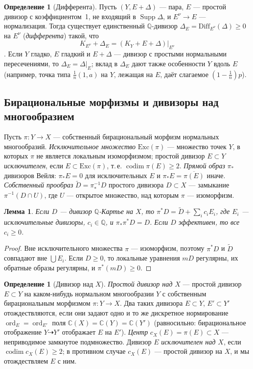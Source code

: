 \documentclass[11pt,a4paper]{article}
\theoremstyle{plain}
\newtheorem{lemma}[theorem]{Лемма}
\theoremstyle{definition}
\newtheorem{definition}[theorem]{Определение}
\theoremstyle{remark}
\renewcommand{\C}{\mathbb{C}}
\newcommand{\Q}{\mathbb{Q}}
\DeclareMathOperator{\ord}{ord}
\DeclareMathOperator{\codim}{codim}
\DeclareMathOperator{\Supp}{Supp}
\begin{document}
\begin{definition}[Дифферента]\label{def:different}
Пусть $(Y,E+\Delta)$ --- пара, $E$ --- простой дивизор с коэффициентом~1, не входящий в
$\Supp\Delta$, и $E^\nu\to E$ --- нормализация. Тогда существует единственный $\Q$-дивизор
$\Delta_E=\mathrm{Diff}_{E^\nu}(\Delta)\ge0$ на $E^\nu$ (\emph{дифферента}) такой, что
\[
K_{E^\nu}+\Delta_E=(K_Y+E+\Delta)|_{E^\nu}
\]
\cite[4.2]{KolSing}. Если $Y$ гладко, $E$ гладкий и $E+\Delta$ --- дивизор с простыми нормальными
пересечениями, то $\Delta_E=\Delta|_E$; вклад в $\Delta_E$ дают также особенности $Y$ вдоль $E$
(например, точка типа $\frac1n(1,a)$ на $Y$, лежащая на $E$, даёт слагаемое $(1-\frac1n)p$).
\end{definition}

\subsection{Бирациональные морфизмы и дивизоры над многообразием}\label{ss:divisors-over}

Пусть $\pi\colon Y\to X$ --- собственный бирациональный морфизм нормальных многообразий.
\emph{Исключительное множество} $\mathrm{Exc}(\pi)$ --- множество точек $Y$, в которых $\pi$ не
является локальным изоморфизмом; простой дивизор $E\subset Y$ \emph{исключителен}, если
$E\subset\mathrm{Exc}(\pi)$, т.\,е. $\codim\pi(E)\ge2$. \emph{Прямой образ} $\pi_*$ дивизоров
Вейля: $\pi_*E=0$ для исключительных $E$ и $\pi_*E=\overline{\pi(E)}$ иначе. \emph{Собственный
прообраз} $\tilde D=\pi^{-1}_*D$ простого дивизора $D\subset X$ --- замыкание $\pi^{-1}(D\cap U)$,
где $U$ --- открытое множество, над которым $\pi$ --- изоморфизм.

\begin{lemma}\label{lem:pullback-exc}
Если $D$ --- дивизор $\Q$-Картье на $X$, то $\pi^*D=\tilde D+\sum_i c_iE_i$, где $E_i$ ---
исключительные дивизоры, $c_i\in\Q$, и $\pi_*\pi^*D=D$. Если $D$ эффективен, то все $c_i\ge0$.
\end{lemma}
\begin{proof}
Вне исключительного множества $\pi$ --- изоморфизм, поэтому $\pi^*D$ и $\tilde D$ совпадают вне
$\bigcup E_i$. Если $D\ge0$, то локальные уравнения $mD$ регулярны, их обратные образы регулярны,
и $\pi^*(mD)\ge0$.
\end{proof}

\begin{definition}[Дивизор над $X$]\label{def:divisor-over}
\emph{Простой дивизор над $X$} --- простой дивизор $E\subset Y$ на каком-нибудь нормальном
многообразии $Y$ с собственным бирациональным морфизмом $\pi\colon Y\to X$. Два таких дивизора
$E\subset Y$, $E'\subset Y'$ отождествляются, если они задают одно и то же дискретное нормирование
$\ord_E=\ord_{E'}$ поля $\C(X)=\C(Y)=\C(Y')$ (равносильно: бирациональное отображение
$Y\dashrightarrow Y'$ отображает $E$ на $E'$). \emph{Центр} $c_X(E)=\pi(E)\subset X$ ---
неприводимое замкнутое подмножество. Дивизор $E$ \emph{исключителен над $X$}, если $\codim c_X(E)\ge2$;
в противном случае $c_X(E)$ --- простой дивизор на $X$, и мы отождествляем $E$ с ним.
\end{definition}
\end{document}
